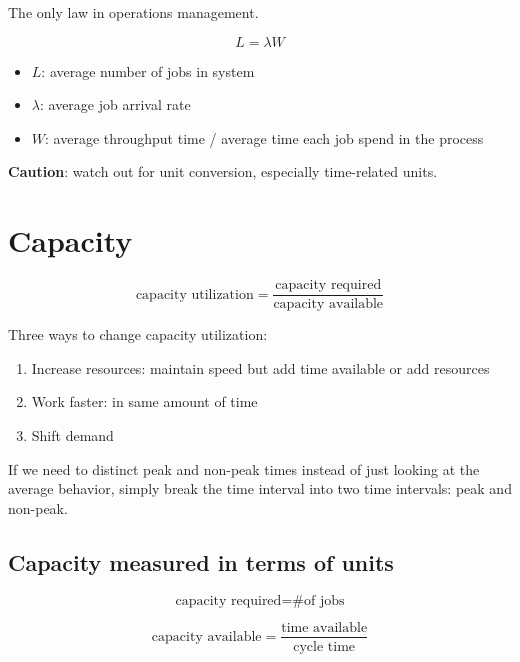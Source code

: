 \documentclass[11pt]{article}
\begin{document}
The only law in operations management.

\begin{equation}
    L = \lambda W
\end{equation}

\begin{itemize}
    \item $L$: average number of jobs in system
    \item $\lambda$: average job arrival rate
    \item $W$: average throughput time / average time each job spend in the process
\end{itemize}

\textbf{Caution}: watch out for unit conversion, especially time-related units.


\section{Capacity}

\begin{equation}
    \text{capacity utilization} = \frac{\text{capacity required}}{\text{capacity available}}
\end{equation}

Three ways to change capacity utilization:

\begin{enumerate}
    \item Increase resources: maintain speed but add time available or add resources
    \item Work faster: in same amount of time
    \item Shift demand
\end{enumerate}

If we need to distinct peak and non-peak times instead of just looking at the average behavior, simply break the time
interval into two time intervals: peak and non-peak.

\subsection{Capacity measured in terms of units}

\begin{equation}
    \text{capacity required} = \text{\# of jobs}
\end{equation}

\begin{equation}
    \text{capacity available} = \frac{\text{time available}}{\text{cycle time}}
\end{equation}
\end{document}
